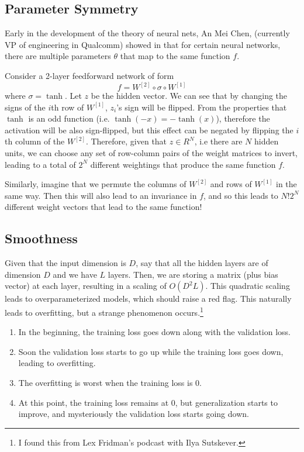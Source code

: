 \subsection{Parameter Symmetry}

  Early in the development of the theory of neural nets, An Mei Chen, (currently VP of engineering in Qualcomm) showed in \cite{symmetry} that for certain neural networks, there are multiple parameters $\theta$ that map to the same function $f$. 

  \begin{theorem}
    \label{thm:parameter-symmetry}
    Consider a 2-layer feedforward network of form 
    \begin{equation}
      f = W^{[2]} \circ \sigma \circ W^{[1]}
    \end{equation} 
    where $\sigma = \tanh$. Let $z$ be the hidden vector. We can see that by changing the signs of the $i$th row of $W^{[1]}$, $z_i$'s sign will be flipped. From the properties that $\tanh$ is an odd function (i.e. $\tanh(-x) = - \tanh(x)$), therefore the activation will be also sign-flipped, but this effect can be negated by flipping the $i$th column of the $W^{[2]}$. Therefore, given that $z \in R^{N}$, i.e there are $N$ hidden units, we can choose any set of row-column pairs of the weight matrices to invert, leading to a total of $2^N$ different weightings that produce the same function $f$. 

    Similarly, imagine that we permute the columns of $W^{[2]}$ and rows of $W^{[1]}$ in the same way. Then this will also lead to an invariance in $f$, and so this leads to $N! 2^N$ different weight vectors that lead to the same function! 
  \end{theorem}

\subsection{Smoothness} 

  Given that the input dimension is $D$, say that all the hidden layers are of dimension $D$ and we have $L$ layers. Then, we are storing a matrix (plus bias vector) at each layer, resulting in a scaling of $O(D^2 L)$. This quadratic scaling leads to overparameterized models, which should raise a red flag. This naturally leads to overfitting, but a strange phenomenon occurs.\footnote{I found this from Lex Fridman's podcast with Ilya Sutskever.}  
  \begin{enumerate}
    \item In the beginning, the training loss goes down along with the validation loss. 
    \item Soon the validation loss starts to go up while the training loss goes down, leading to overfitting. 
    \item The overfitting is worst when the training loss is $0$. 
    \item At this point, the training loss remains at $0$, but generalization starts to improve, and mysteriously the validation loss starts going down. 
  \end{enumerate}

